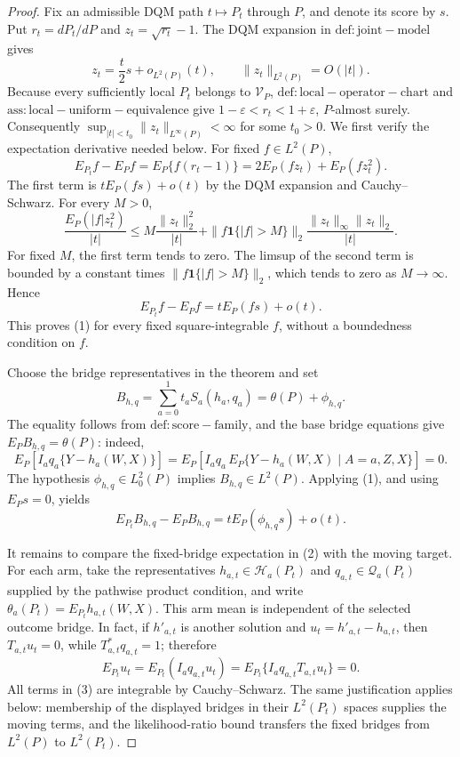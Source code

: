 \documentclass{article}
\begin{document}
\begin{proof}
Fix an admissible DQM path \(t\mapsto P_t\) through \(P\), and denote its score by \(s\).  Put \(r_t=dP_t/dP\) and \(z_t=\sqrt{r_t}-1\).  The DQM expansion in \(\mathrm{def:joint-model}\) gives
\[
 z_t=\frac{t}{2}s+o_{L^2(P)}(t),
 \qquad \|z_t\|_{L^2(P)}=O(|t|).
\]
Because every sufficiently local \(P_t\) belongs to \(\mathcal V_P\), \(\mathrm{def:local-operator-chart}\) and \(\mathrm{ass:local-uniform-equivalence}\) give \(1-\varepsilon<r_t<1+\varepsilon\), \(P\)-almost surely.  Consequently \(\sup_{|t|<t_0}\|z_t\|_{L^\infty(P)}<\infty\) for some \(t_0>0\).  We first verify the expectation derivative needed below.  For fixed \(f\in L^2(P)\),
\[
 E_{P_t}f-E_Pf
 =E_P\{f(r_t-1)\}
 =2E_P(fz_t)+E_P(fz_t^2).
\]
The first term is \(tE_P(fs)+o(t)\) by the DQM expansion and Cauchy--Schwarz.  For every \(M>0\),
\[
 \frac{E_P(|f|z_t^2)}{|t|}
 \le
 M\frac{\|z_t\|_2^2}{|t|}
 +\|f\mathbf 1\{|f|>M\}\|_2
   \frac{\|z_t\|_\infty\|z_t\|_2}{|t|}.
\]
For fixed \(M\), the first term tends to zero.  The limsup of the second term is bounded by a constant times \(\|f\mathbf 1\{|f|>M\}\|_2\), which tends to zero as \(M\to\infty\).  Hence
\[
 E_{P_t}f-E_Pf=tE_P(fs)+o(t).                                      \tag{1}
\]
This proves (1) for every fixed square-integrable \(f\), without a boundedness condition on \(f\).

Choose the bridge representatives in the theorem and set
\[
 B_{h,q}=\sum_{a=0}^1t_aS_a(h_a,q_a)
          =\theta(P)+\phi_{h,q}.
\]
The equality follows from \(\mathrm{def:score-family}\), and the base bridge equations give \(E_P B_{h,q}=\theta(P)\): indeed,
\[
 E_P[I_aq_a\{Y-h_a(W,X)\}]
 =E_P[I_aq_a\,E_P\{Y-h_a(W,X)\mid A=a,Z,X\}]=0.
\]
The hypothesis \(\phi_{h,q}\in L_0^2(P)\) implies \(B_{h,q}\in L^2(P)\).  Applying (1), and using \(E_Ps=0\), yields
\[
 E_{P_t}B_{h,q}-E_PB_{h,q}
 =tE_P(\phi_{h,q}s)+o(t).                                           \tag{2}
\]

It remains to compare the fixed-bridge expectation in (2) with the moving target.  For each arm, take the representatives \(h_{a,t}\in\mathcal H_a(P_t)\) and \(q_{a,t}\in\mathcal Q_a(P_t)\) supplied by the pathwise product condition, and write
\(\theta_a(P_t)=E_{P_t}h_{a,t}(W,X)\).  This arm mean is independent of the selected outcome bridge.  In fact, if \(h'_{a,t}\) is another solution and \(u_t=h'_{a,t}-h_{a,t}\), then \(T_{a,t}u_t=0\), while \(T_{a,t}^*q_{a,t}=1\); therefore
\[
 E_{P_t}u_t
 =E_{P_t}(I_aq_{a,t}u_t)
 =E_{P_t}\{I_aq_{a,t}T_{a,t}u_t\}=0.                               \tag{3}
\]
All terms in (3) are integrable by Cauchy--Schwarz.  The same justification applies below: membership of the displayed bridges in their \(L^2(P_t)\) spaces supplies the moving terms, and the likelihood-ratio bound transfers the fixed bridges from \(L^2(P)\) to \(L^2(P_t)\).


\end{proof}
\end{document}
